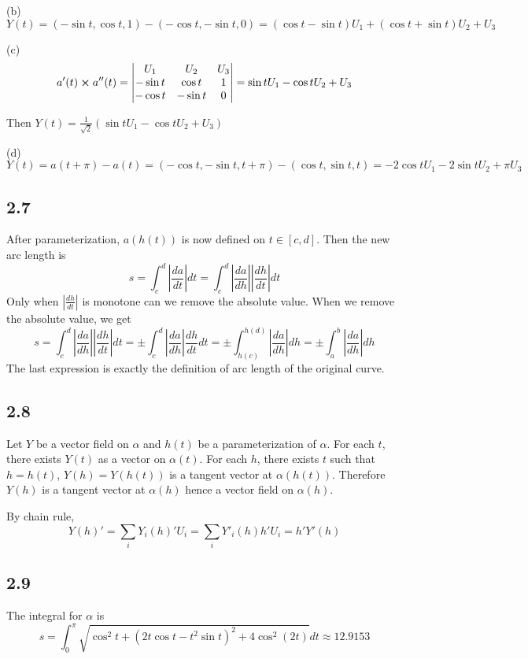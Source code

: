 \documentclass[12pt]{article}
\begin{document}
(b) $Y(t) = (-\sin t, \cos t, 1) - (-\cos t, -\sin t, 0) = (\cos t - \sin t)U_1 + (\cos t + \sin t)U_2 + U_3$

(c) $$a'(t) \cross a''(t) = \begin{vmatrix}
	U_1 & U_2 & U_3 \\
	-\sin t & \cos t & 1 \\
	-\cos t & -\sin t & 0 \\
\end{vmatrix} = \sin t U_1 - \cos t U_2 + U_3$$

Then $Y(t) = \frac{1}{\sqrt{2}}(\sin t U_1 - \cos t U_2 + U_3)$

(d) $Y(t) = a(t+\pi) - a(t) = (-\cos t, -\sin t, t+\pi) - (\cos t, \sin t, t) = -2\cos t U_1 - 2 \sin t U_2 + \pi U_3 $

\subsection*{2.7}
After parameterization, $a(h(t))$ is now defined on $t\in [c, d]$. Then the new arc length is $$ s = \int_c^d \left|\frac{da}{dt}\right|dt = \int_c^d \left|\frac{da}{dh}\right| \left|\frac{dh}{dt}\right|dt $$ 
Only when $\left|\frac{dh}{dt}\right|$ is monotone can we remove the absolute value. When we remove the absolute value, we get
$$ s = \int_c^d \left|\frac{da}{dh}\right| \left|\frac{dh}{dt}\right|dt = \pm \int_c^d \left|\frac{da}{dh}\right| \frac{dh}{dt} dt =  \pm \int_{h(c)}^{h(d)} \left|\frac{da}{dh}\right| dh  = \pm \int_{a}^{b} \left|\frac{da}{dh}\right| dh  $$ 
The last expression is exactly the definition of arc length of the original curve. \QED

\subsection*{2.8}
Let $Y$ be a vector field on $\alpha$ and $h(t)$ be a parameterization of $\alpha$. For each $t$, there exists $Y(t)$ as a vector on $\alpha(t)$. For each $h$, there exists $t$ such that $h=h(t)$, $Y(h) = Y(h(t))$ is a tangent vector at $\alpha(h(t))$. Therefore $Y(h)$ is a tangent vector at $\alpha(h)$ hence a vector field on $\alpha(h)$. 

By chain rule, $$Y(h)' = \sum_i Y_i(h)'U_i = \sum_i Y'_i(h)h'U_i = h'Y'(h)$$  \QED

\subsection*{2.9}
The integral for $\alpha$ is $$s = \int^\pi_0 \sqrt{\cos^2 t + (2t\cos t - t^2 \sin t)^2 + 4 \cos^2(2t)} dt \approx 12.9153$$
\end{document}
